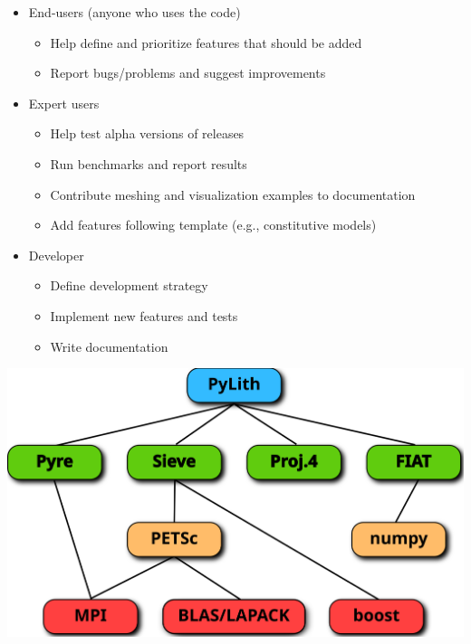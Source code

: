 \documentclass[pdftex,cig,slideColor]{pp4slides}
\begin{document}

  \begin{itemize}
  \item End-users (anyone who uses the code)
    \begin{itemize}
    \item Help define and prioritize features that should be added
    \item Report bugs/problems and suggest improvements
    \end{itemize}
  \item Expert users
    \begin{itemize}
    \item Help test alpha versions of releases
    \item Run benchmarks and report results
    \item Contribute meshing and visualization examples to documentation
    \item Add features following template (e.g., constitutive models)
    \end{itemize}
  \item Developer
    \begin{itemize}
    \item Define development strategy 
    \item Implement new features and tests
    \item Write documentation
    \end{itemize}
  \end{itemize}


  \vfill
  \begin{center}
    \includegraphics[scale=0.9]{figs/packages}
  \end{center}
\end{document}
